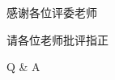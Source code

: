 \documentclass[aspectratio=169,UTF8,xcolor=table]{ctexbeamer}
\begin{document}
\begin{frame}[plain]
  \begin{center}
    \vspace{1.5cm}
    {\Huge\color{ustcblue} 感谢各位评委老师}

    \vspace{1cm}
    {\Large 请各位老师批评指正}

    \vspace{2cm}
    {\large Q \& A}
  \end{center}
\end{frame}
\end{document}
